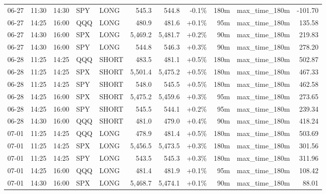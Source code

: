 \documentclass[11pt,a4paper,twoside]{article}
\begin{document}
\begin{center}
\begin{longtable}{>{\color{txtmain}}l l l l l r r r r >{\color{txtmain}}l r}
06-27 & 11:30 & 14:30 & SPY & LONG & 545.3 & 544.8 & \textcolor{lossred}{-0.1\%} & 180m & max\_time\_180m & \textcolor{lossred}{-101.70} \\
06-27 & 14:25 & 16:00 & QQQ & LONG & 480.9 & 481.6 & \textcolor{wingreen}{+0.1\%} & 95m & max\_time\_180m & \textcolor{wingreen}{135.58} \\
06-27 & 14:30 & 16:00 & SPX & LONG & 5,469.2 & 5,481.7 & \textcolor{wingreen}{+0.2\%} & 90m & max\_time\_180m & \textcolor{wingreen}{219.83} \\
06-27 & 14:30 & 16:00 & SPY & LONG & 544.8 & 546.3 & \textcolor{wingreen}{+0.3\%} & 90m & max\_time\_180m & \textcolor{wingreen}{278.20} \\
06-28 & 11:25 & 14:25 & QQQ & SHORT & 483.5 & 481.1 & \textcolor{wingreen}{+0.5\%} & 180m & max\_time\_180m & \textcolor{wingreen}{502.87} \\
06-28 & 11:25 & 14:25 & SPX & SHORT & 5,501.4 & 5,475.2 & \textcolor{wingreen}{+0.5\%} & 180m & max\_time\_180m & \textcolor{wingreen}{467.33} \\
06-28 & 11:25 & 14:25 & SPY & SHORT & 548.0 & 545.5 & \textcolor{wingreen}{+0.5\%} & 180m & max\_time\_180m & \textcolor{wingreen}{462.58} \\
06-28 & 14:25 & 16:00 & SPX & SHORT & 5,475.2 & 5,459.6 & \textcolor{wingreen}{+0.3\%} & 95m & max\_time\_180m & \textcolor{wingreen}{273.65} \\
06-28 & 14:25 & 16:00 & SPY & SHORT & 545.5 & 544.1 & \textcolor{wingreen}{+0.2\%} & 95m & max\_time\_180m & \textcolor{wingreen}{239.34} \\
06-28 & 14:30 & 16:00 & QQQ & SHORT & 481.0 & 479.0 & \textcolor{wingreen}{+0.4\%} & 90m & max\_time\_180m & \textcolor{wingreen}{418.24} \\
07-01 & 11:25 & 14:25 & QQQ & LONG & 478.9 & 481.4 & \textcolor{wingreen}{+0.5\%} & 180m & max\_time\_180m & \textcolor{wingreen}{503.69} \\
07-01 & 11:25 & 14:25 & SPX & LONG & 5,456.5 & 5,473.5 & \textcolor{wingreen}{+0.3\%} & 180m & max\_time\_180m & \textcolor{wingreen}{301.56} \\
07-01 & 11:25 & 14:25 & SPY & LONG & 543.5 & 545.3 & \textcolor{wingreen}{+0.3\%} & 180m & max\_time\_180m & \textcolor{wingreen}{311.96} \\
07-01 & 14:25 & 16:00 & QQQ & LONG & 481.4 & 481.9 & \textcolor{wingreen}{+0.1\%} & 95m & max\_time\_180m & \textcolor{wingreen}{108.42} \\
07-01 & 14:30 & 16:00 & SPX & LONG & 5,468.7 & 5,474.1 & \textcolor{wingreen}{+0.1\%} & 90m & max\_time\_180m & \textcolor{wingreen}{88.01} \\

\end{longtable}
\end{center}
\end{document}
